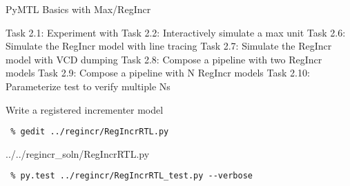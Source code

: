 %
%
%
%
%

\begin{frame}{ PyMTL Basics with Max/RegIncr}
\begin{cbxlist}
  \1 Task 2.1: Experiment with 
  \1 Task 2.2: Interactively simulate a max unit
  \1 
  \1 
  \1 
  \1 Task 2.6: Simulate the RegIncr model with line tracing
  \1 Task 2.7: Simulate the RegIncr model with VCD dumping
  \1 Task 2.8: Compose a pipeline with two RegIncr models
  \1 Task 2.9: Compose a pipeline with N RegIncr models
  \1 Task 2.10: Parameterize test to verify multiple Ns
\end{cbxlist}
\end{frame}

\begin{task}\begin{frame}[fragile]{Write a registered incrementer model}

\vspace{-0.15in}
\begin{Verbatim}[commandchars=\\\{\}]
 % cd    \midtilde/pymtl-tut/build
 % gedit ../regincr/RegIncrRTL.py
\end{Verbatim}
\vspace{-0.17in}

%
{../../regincr_soln/RegIncrRTL.py}

\vspace{-0.2in}
\begin{Verbatim}
 % py.test ../regincr/RegIncrRTL_test.py --verbose
\end{Verbatim}
\end{frame}
\end{task}

